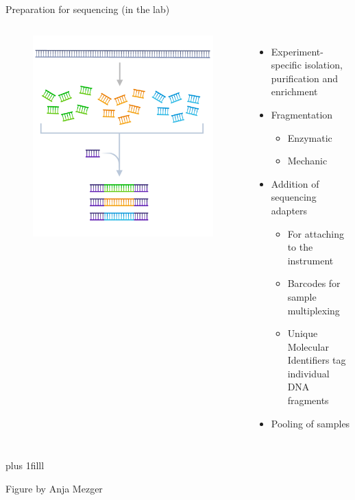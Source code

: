 \documentclass[10pt]{beamer}
\newcommand{\creditdarkleft}[1]{{\vskip0pt plus 1filll \par \raggedright \scriptsize \mdseries \color{scMGray} #1 \par}}
\begin{document}
\begin{frame}[standout]{Preparation for sequencing (in the lab)}
	\begin{columns}[T,onlytextwidth]
		\hspace*{-0.7cm} 
		\begin{figure}
			\includegraphics[width=\textwidth]{figures/library-prep.png}
		\end{figure}
			\normalsize \normalfont
			\begin{itemize}
				\item Experiment-specific isolation, purification and enrichment
				\item Fragmentation
				\begin{itemize}
					\item Enzymatic
					\item Mechanic
				\end{itemize}
				\item Addition of sequencing adapters 
				\begin{itemize}
					\item For attaching to the instrument
					\item Barcodes for sample multiplexing
					\item Unique Molecular Identifiers tag individual DNA fragments
				\end{itemize}
				\item Pooling of samples
			\end{itemize}
	\end{columns}
\creditdarkleft{Figure by Anja Mezger}
\end{frame}
\end{document}

